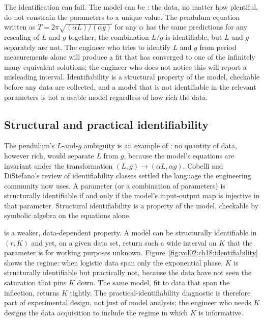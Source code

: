 The identification can fail. The model can be :
the data, no matter how plentiful, do not constrain the parameters
to a unique value. The pendulum equation written as
$T = 2\pi\sqrt{(\alpha L) / (\alpha g)}$ for any $\alpha$ has the
same predictions for any rescaling of $L$ and $g$ together; the
combination $L/g$ is identifiable, but $L$ and $g$ separately are
not. The engineer who tries to identify $L$ and $g$ from period
measurements alone will produce a fit that has converged to one of
the infinitely many equivalent solutions; the engineer who does not
notice this will report a misleading interval. Identifiability is a
structural property of the model, checkable before any data are
collected, and a model that is not identifiable in the relevant
parameters is not a usable model regardless of how rich the data.

\subsection{Structural and practical identifiability}

The pendulum's $L$-and-$g$ ambiguity is an example of
: no quantity of data, however
rich, would separate $L$ from $g$, because the model's equations are
invariant under the transformation $(L, g) \to (\alpha L, \alpha g)$.
Cobelli and DiStefano's review of identifiability classes
\cite{paper:v2ch18-cobelli-distefano-1980} settled the language the
engineering community now uses. A parameter (or a combination of
parameters) is structurally identifiable if and only if the model's
input-output map is injective in that parameter. Structural
identifiability is a property of the model, checkable by symbolic
algebra on the equations alone.

 is a weaker, data-dependent
property. A model can be structurally identifiable in $(r, K)$ and
yet, on a given data set, return such a wide interval on $K$ that
the parameter is for working purposes unknown.
Figure~\ref{fig:vol02:ch18:identifiability} shows the regime: when
logistic data span only the exponential phase, $K$ is structurally
identifiable but practically not, because the data have not seen
the saturation that pins $K$ down. The same model, fit to data that
span the inflection, returns $K$ tightly. The practical-identifiability
diagnostic is therefore part of experimental design, not just of model
analysis; the engineer who needs $K$ designs the data acquisition to
include the regime in which $K$ is informative.

